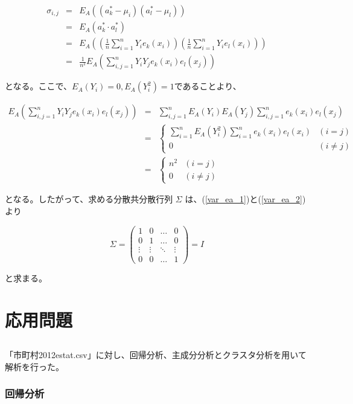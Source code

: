 \documentclass[a4paper,xelatex,ja=standard,jafont=hiragino-pron]{bxjsarticle}
\begin{document}
\begin{eqnarray}
  \sigma_{i, j}
    &=& E_A
      \left(
        \left(a^*_k - \mu_i\right)
        \left(a^*_l - \mu_l\right)
      \right) \nonumber \\
    &=& E_A\left(a^*_k \cdot a^*_l \right) \nonumber \\
    &=& E_A
      \left(
        \left(\frac{1}{n} \sum_{i = 1}^n Y_i e_k (x_i)\right)
        \left(\frac{1}{n} \sum_{i = 1}^n Y_i e_l (x_i)\right)
      \right) \nonumber \\
    &=& \frac{1}{n^2} E_A
      \left(
        \sum_{i, j = 1}^n Y_i Y_j e_k(x_i) e_l(x_j)
      \right) \label{var_ea_1}
\end{eqnarray}

となる。ここで、$E_A(Y_i) = 0, E_A(Y_i^2) = 1$であることより、

\begin{eqnarray}
  E_A\left(
    \sum_{i, j = 1}^n Y_i Y_j e_k(x_i) e_l(x_j)
  \right)
    &=& \sum_{i, j = 1}^n E_A(Y_i)E_A(Y_j) \sum_{i, j = 1}^n e_k(x_i) e_l(x_j) \nonumber \\
    &=& \begin{cases}
      \sum_{i = 1}^n E_A(Y_i^2) \sum_{i = 1}^n e_k(x_i) e_l(x_i) & (i = j) \\
      0  & (i \neq j)
    \end{cases} \nonumber \\
    &=& \begin{cases}
      n^2 & (i = j) \\
      0 & (i \neq j)
    \end{cases} \label{var_ea_2}
\end{eqnarray}

となる。したがって、求める分散共分散行列 $\Sigma$ は、(\ref{var_ea_1})と(\ref{var_ea_2})より

\begin{equation}
  \Sigma = \left(
    \begin{array}{cccc}
      1 & 0 & \ldots & 0 \\
      0 & 1 & \ldots & 0 \\
      \vdots & \vdots & \ddots & \vdots \\
      0 & 0 & \ldots & 1
    \end{array}
  \right) = I
\end{equation}

と求まる。

\subsection{}


\section{応用問題}

\subsection{}
「市町村2012estat.csv」に対し、回帰分析、主成分分析とクラスタ分析を用いて解析を行った。

\subsubsection{回帰分析}
\end{document}
